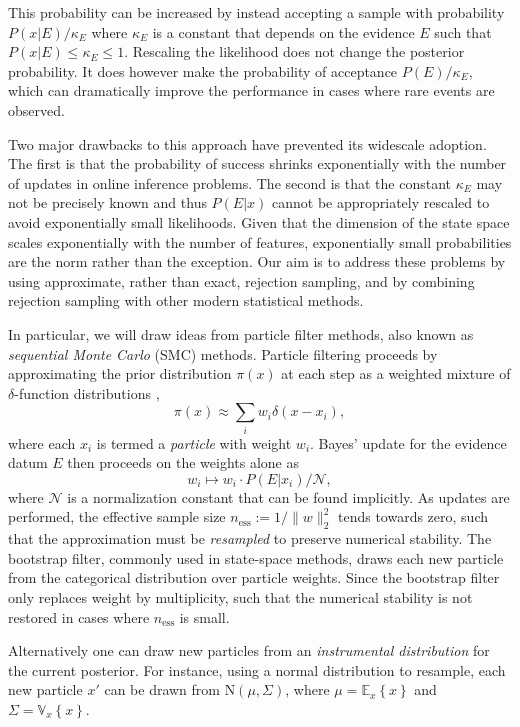 \documentclass[twoside]{article}
\newcommand{\expect}[2]{{\mathbb{E}_{#2}}\!\left\{#1 \right\}}
\newcommand{\var}[2]{{\mathbb{V}_{#2}}\!\left\{#1 \right\}}
\newcommand{\ess}{\mathrm{ess}}
\newcommand{\NN}{\mathrm{N}}
\newcommand{\defeq}{\mathrel{:=}}
\begin{document}
This probability
can be increased by instead accepting a sample with probability $P(x|E)/\kappa_E$ where
$\kappa_E$ is a constant that depends on the evidence $E$ such that $P(x|E) \le \kappa_E \le 1$.
Rescaling the likelihood does not change the posterior probability.
It does however make the probability of acceptance $P(E)/\kappa_E$, which
can dramatically improve the performance in cases where rare events are observed.

Two major drawbacks to this approach have prevented its widescale adoption.  The first is that the probability of success shrinks exponentially with the number of updates
in online inference problems.
The second  is that the constant $\kappa_E$ may not be precisely known and thus $P(E|x)$ cannot be appropriately rescaled to avoid exponentially small likelihoods.  Given that the dimension of the state
space scales exponentially with the number of features, exponentially small probabilities are the norm rather than the exception. 
Our aim is to address these problems
by using approximate, rather than exact, rejection sampling, and
by combining rejection sampling with other modern statistical methods.

In particular, we will draw ideas from particle filter methods, also known as \emph{sequential Monte Carlo} (SMC) methods. Particle filtering proceeds
by approximating the prior distribution $\pi(x)$ at each step as a weighted
mixture of $\delta$-function distributions \cite{doucet_introduction_2001},
\begin{equation}
    \pi(x) \approx \sum_i w_i \delta(x - x_i),
\end{equation}
where each $x_i$ is termed a \emph{particle} with weight $w_i$.
Bayes' update for the evidence datum $E$ then proceeds on the weights alone as
\begin{equation}
    w_i \mapsto w_i \cdot P(E | x_i) / \mathcal{N},
\end{equation}
where $\mathcal{N}$ is a normalization constant that can be found implicitly.
As updates are performed, the effective sample size $n_\ess \defeq
1 / \|w\|_2^2$ tends towards zero, such that the approximation must be
\emph{resampled} to preserve numerical stability. The bootstrap filter,
commonly used in state-space methods, draws each new particle from the categorical
distribution over particle weights. 
Since the bootstrap filter only replaces weight by multiplicity,
such that the numerical stability is not restored in cases where $n_\ess$ is small.

Alternatively one can draw new particles from an \emph{instrumental distribution} for
the current posterior. For instance, using a normal distribution to resample,
each new particle $x'$ can be drawn from $\NN(\mu, \Sigma)$, where
$\mu = \expect{x}{x}$ and $\Sigma = \var{x}{x}$.
\end{document}
